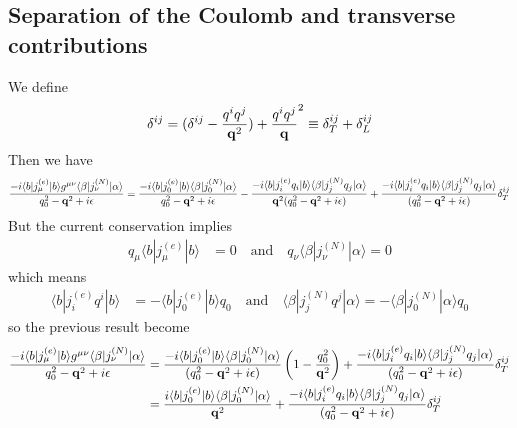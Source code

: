 \subsection{Separation of the Coulomb and transverse contributions}
We define
\begin{align}
    \delta^{ij} = (\delta^{ij} - \frac{{q}^i {q}^j}{{\bf q}^2}) + \frac{{q}^i {q}^j}{\bf q}^2\equiv \delta^{ij}_T + \delta^{ij}_L
\end{align}
Then we have
\begin{align}
    \frac{-i\langle b| j^{(e)}_{\mu} |b\rangle  g^{\mu\nu}\langle \beta| j^{(N)}_{\nu} |\alpha\rangle}{q_0^2 -{\bf q}^2+ i\epsilon} = \frac{-i\langle b| j^{(e)}_{0} |b\rangle  \langle \beta| j^{(N)}_{0} |\alpha\rangle}{q_0^2 -{\bf q}^2+ i\epsilon} - \frac{-i\langle b| j^{(e)}_{i}  q_i|b\rangle  \langle \beta| j^{(N)}_{j} q_j |\alpha\rangle}{{\bf q}^2(q_0^2 -{\bf q}^2+ i\epsilon)}+ \frac{-i\langle b| j^{(e)}_{i}  q_i|b\rangle  \langle \beta| j^{(N)}_{j} q_j |\alpha\rangle}{(q_0^2 -{\bf q}^2+ i\epsilon)}\delta^{ij}_T
\end{align}
But the current conservation implies
\begin{align}
    q_{\mu} \langle b| j^{(e)}_{\mu} |b\rangle & = 0 \quad \text{and} \quad q_{\nu} \langle \beta| j^{(N)}_{\nu} |\alpha\rangle = 0
\end{align}
which means
\begin{align}
    \langle b| j^{(e)}_{i} q^i |b\rangle & = -{\langle b| j^{(e)}_{0}  |b\rangle}q_0 \quad \text{and} \quad \langle \beta| j^{(N)}_{j} q^j |\alpha\rangle = -{\langle \beta| j^{(N)}_{0}  |\alpha\rangle} q_0
\end{align}
so the previous result become
\begin{align}
    \frac{-i\langle b| j^{(e)}_{\mu} |b\rangle  g^{\mu\nu}\langle \beta| j^{(N)}_{\nu} |\alpha\rangle}{q_0^2 -{\bf q}^2+ i\epsilon} & = \frac{-i\langle b| j^{(e)}_{0} |b\rangle  \langle \beta| j^{(N)}_{0}  |\alpha\rangle}{(q_0^2 -{\bf q}^2+ i\epsilon)} \left(1-\frac{q_0^2}{{\bf q}^2}    \right) + \frac{-i\langle b| j^{(e)}_{i}  q_i|b\rangle  \langle \beta| j^{(N)}_{j} q_j |\alpha\rangle}{(q_0^2 -{\bf q}^2+ i\epsilon)}\delta^{ij}_T \nonumber \\
                                                                                                                                    & = \frac{i\langle b| j^{(e)}_{0} |b\rangle  \langle \beta| j^{(N)}_{0}  |\alpha\rangle}{{\bf q}^2}  + \frac{-i\langle b| j^{(e)}_{i}  q_i|b\rangle  \langle \beta| j^{(N)}_{j} q_j |\alpha\rangle}{(q_0^2 -{\bf q}^2+ i\epsilon)}\delta^{ij}_T
\end{align}
